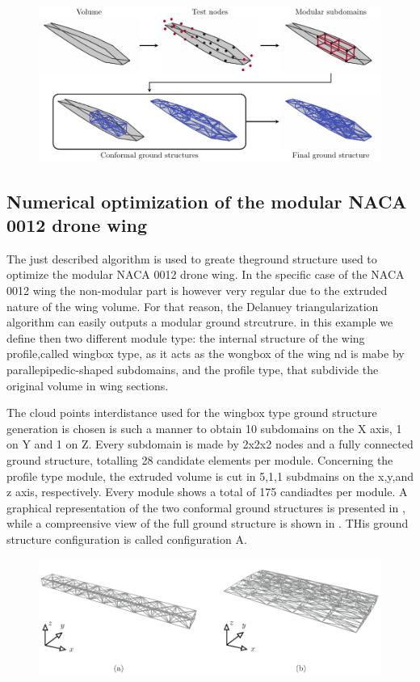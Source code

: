 \begin{figure}
    \centering
    \includegraphics[width=\linewidth]{figures/07_aeronautic/00_naca_howtomesh/MESH.pdf}
     \caption{}
    \label{fig:07_howto}
\end{figure}

\subsection{Numerical optimization of the modular NACA 0012 drone wing}
The just described algorithm is used to greate theground structure used to optimize the modular NACA 0012 drone wing. In the specific case of the NACA 0012 wing the non-modular part is however very regular due to the extruded nature of the wing volume. For that reason, the Delanuey triangularization algorithm can easily outputs a modular ground strcutrure. in this example we define then two different module type: the internal structure of the wing profile,called wingbox type, as it acts as the wongbox of the wing nd is mabe by parallepipedic-shaped subdomains, and the profile type, that subdivide the original volume in wing sections.

The cloud points interdistance used for the wingbox type ground structure generation is chosen is such a manner to obtain 10 subdomains on the X axis, 1 on Y and 1 on Z. Every subdomain is made by 2x2x2 nodes and a fully connected ground structure, totalling 28 candidate elements per module. Concerning the profile type module, the extruded volume is cut in 5,1,1 subdmains on the x,y,and z axis, respectively. Every module shows a total of 175 candiadtes per module. A graphical representation of the two conformal ground structures is presented in , while a compreensive view of the full ground structure is shown in . THis ground structure configuration is called configuration A.

\begin{figure}
    \centering
    \includegraphics[width=\linewidth]{figures/07_aeronautic/00_NACA_a_gs_cell/gs_a_types.pdf}
     \caption{}
    \label{fig:07_gs_a_types}
\end{figure}

